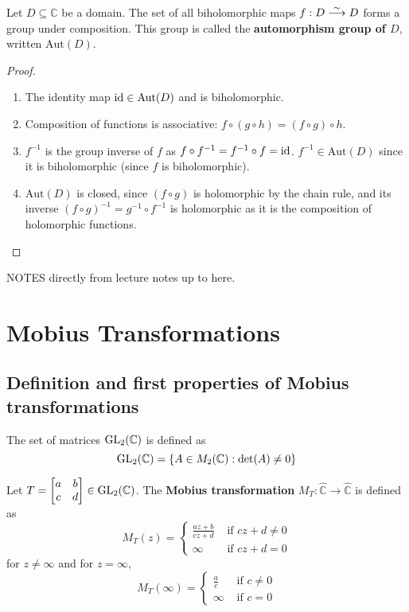 \begin{lemma}
	Let $D \subseteq \mathbb{C}$ be a domain. The set of all biholomorphic maps $f: D \mathrel{\overset{\sim}{\longrightarrow}} D$ forms a group under composition. This group is called the \textbf{automorphism group of $D$}, written $\text{Aut}(D)$.
\end{lemma}

\begin{proof}
	\hfill
	\begin{enumerate}
		\item The identity map $\text{id} \in \text{Aut}(D)$ and is biholomorphic.
		\item Composition of functions is associative: $f \circ (g \circ h) = (f \circ g) \circ h$.
		\item $f^{-1}$ is the group inverse of $f$ as $f \circ f^{-1} = f^{-1} \circ f = \text{id}$. $f^{-1} \in \text{Aut}(D)$ since it is biholomorphic (since $f$ is biholomorphic).
		\item $\text{Aut}(D)$ is closed, since $(f \circ g)$ is holomorphic by the chain rule, and its inverse ${(f \circ g)}^{-1} = g^{-1} \circ f^{-1}$ is holomorphic as it is the composition of holomorphic functions.
	\end{enumerate}
\end{proof}

NOTES directly from lecture notes up to here.

\section{Mobius Transformations}

\subsection{Definition and first properties of Mobius transformations}

\begin{definition}
	The set of matrices $\text{GL}_2(\mathbb{C})$ is defined as
	\[
		\text{GL}_2(\mathbb{C}) = \{ A \in M_2(\mathbb{C}): \det(A) \ne 0 \}
	\]
\end{definition}

\begin{definition}
	Let $T = \begin{bmatrix}
		a & b \\
		c & d
	\end{bmatrix} \in \text{GL}_2(\mathbb{C})$. The \textbf{Mobius transformation} $M_T: \hat{\mathbb{C}} \to \hat{\mathbb{C}}$ is defined as
	\[
		M_T(z) = \begin{cases}
			\frac{az + b}{cz + d} & \text{ if } cz + d \ne 0 \\
			\infty & \text{ if } cz + d = 0
		\end{cases}
	\]
	for $z \ne \infty$ and for $z = \infty$,
	\[
		M_T(\infty) = \begin{cases}
			\frac{a}{c} & \text{ if } c \ne 0 \\
			\infty & \text{ if } c = 0
		\end{cases}
	\]
\end{definition}

